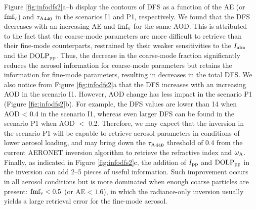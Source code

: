 Figure \ref{fig:infodfs2}a--b display the contours of DFS as a function 
of the AE (or $\text{fmf}_\text{v}$) and ${\tau_\text{A}}_{440}$ in the scenarios I1 and P1, 
respectively. We found that the DFS decreases with an increasing AE and
$\text{fmf}_\text{v}$ for the same AOD. This is attributed to the fact that the 
coarse-mode parameters are more difficult to retrieve than their 
fine-mode counterparts, restrained by their weaker sensitivities to 
the $I_\text{alm}$ and the $\text{DOLP}_\text{pp}$. Thus, the decrease in the coarse-mode 
fraction significantly reduces the aerosol information for coarse-mode 
parameters but retains the information for fine-mode parameters, resulting in 
decreases in the total DFS. We also notice from Figure
\ref{fig:infodfs2}a that the DFS increases with an increasing AOD in the
scenario I1. However, AOD change has less impact in the scenario P1
(Figure \ref{fig:infodfs2}b). For example, the DFS values are lower than 14 
when AOD < 0.4 in the scenario I1, whereas even larger DFS can be found in 
the scenario P1 when AOD $<$ 0.2. Therefore, we may expect that the inversion 
in the scenario P1 will be capable to retrieve aerosol parameters in conditions
of lower aerosol loading, and may bring down the ${\tau_\text{A}}_{440}$ threshold of 
0.4 from the current AERONET inversion algorithm to retrieve the refractive
index and $\omega_\text{A}$. Finally, as indicated in Figure \ref{fig:infodfs2}c, 
the addition of $I_\text{pp}$ and $\text{DOLP}_\text{pp}$ in the inversion can add 2--5 pieces of 
useful information. Such improvement occurs in all aerosol conditions but is 
more dominated when enough coarse particles are present: $\text{fmf}_\text{v}<0.5$ (or
AE$<1.6$), in which the radiance-only inversion usually yields a large 
retrieval error for the fine-mode aerosol. 

